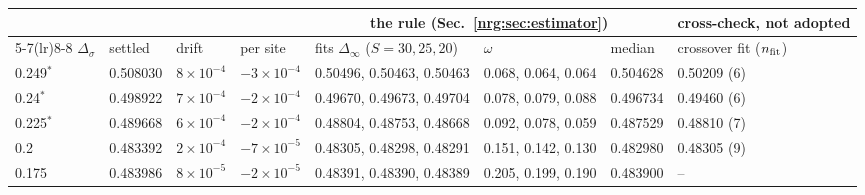 \begin{tabular}{@{}llllllll@{}}
\toprule
 & & & & \multicolumn{3}{c}{the rule (Sec.~\ref{nrg:sec:estimator})} & cross-check, not adopted\\
\cmidrule(lr){5-7}\cmidrule(lr){8-8}
$\Delta_\sigma$ & settled & drift & per site & fits $\Delta_\infty$ ($S=30,25,20$) & $\omega$ & median & crossover fit ($n_{\rm fit}$)\\
\midrule
0.249$^\ast$ & 0.508030 & $8\times10^{-4}$ & $-3\times10^{-4}$ & 0.50496, 0.50463, 0.50463 & 0.068, 0.064, 0.064 & 0.504628 & 0.50209 (6)\\
0.24$^\ast$ & 0.498922 & $7\times10^{-4}$ & $-2\times10^{-4}$ & 0.49670, 0.49673, 0.49704 & 0.078, 0.079, 0.088 & 0.496734 & 0.49460 (6)\\
0.225$^\ast$ & 0.489668 & $6\times10^{-4}$ & $-2\times10^{-4}$ & 0.48804, 0.48753, 0.48668 & 0.092, 0.078, 0.059 & 0.487529 & 0.48810 (7)\\
0.2 & 0.483392 & $2\times10^{-4}$ & $-7\times10^{-5}$ & 0.48305, 0.48298, 0.48291 & 0.151, 0.142, 0.130 & 0.482980 & 0.48305 (9)\\
0.175 & 0.483986 & $8\times10^{-5}$ & $-2\times10^{-5}$ & 0.48391, 0.48390, 0.48389 & 0.205, 0.199, 0.190 & 0.483900 & --\\
\bottomrule
\end{tabular}
